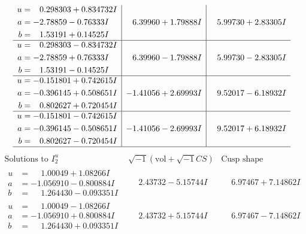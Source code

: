 \documentclass[1p]{elsarticle_modified}
\theoremstyle{definition}
\newcommand{\I}{\sqrt{-1}}
\begin{document}
$$\begin{array}{c|c|c}
\begin{aligned}
u &= \phantom{-}0.298303 + 0.834732 I \\
a &= -2.78859 - 0.76333 I \\
b &= \phantom{-}1.53191 + 0.14525 I\end{aligned}
 & \phantom{-}6.39960 + 1.79888 I & \phantom{-}5.99730 + 2.83305 I \\ \hline\begin{aligned}
u &= \phantom{-}0.298303 - 0.834732 I \\
a &= -2.78859 + 0.76333 I \\
b &= \phantom{-}1.53191 - 0.14525 I\end{aligned}
 & \phantom{-}6.39960 - 1.79888 I & \phantom{-}5.99730 - 2.83305 I \\ \hline\begin{aligned}
u &= -0.151801 + 0.742615 I \\
a &= -0.396145 + 0.508651 I \\
b &= \phantom{-}0.802627 + 0.720454 I\end{aligned}
 & -1.41056 + 2.69993 I & \phantom{-}9.52017 - 6.18932 I \\ \hline\begin{aligned}
u &= -0.151801 - 0.742615 I \\
a &= -0.396145 - 0.508651 I \\
b &= \phantom{-}0.802627 - 0.720454 I\end{aligned}
 & -1.41056 - 2.69993 I & \phantom{-}9.52017 + 6.18932 I\\
 \hline 
 \end{array}$$\newpage$$\begin{array}{c|c|c}  
\text{Solutions to }I^u_{2}& \I (\text{vol} + \sqrt{-1}CS) & \text{Cusp shape}\\
 \hline 
\begin{aligned}
u &= \phantom{-}1.00049 + 1.08266 I \\
a &= -1.056910 - 0.800884 I \\
b &= \phantom{-}1.264430 - 0.093351 I\end{aligned}
 & \phantom{-}2.43732 - 5.15744 I & \phantom{-}6.97467 + 7.14862 I \\ \hline\begin{aligned}
u &= \phantom{-}1.00049 - 1.08266 I \\
a &= -1.056910 + 0.800884 I \\
b &= \phantom{-}1.264430 + 0.093351 I\end{aligned}
 & \phantom{-}2.43732 + 5.15744 I & \phantom{-}6.97467 - 7.14862 I \\ \hline\begin{aligned}

\end{aligned}
\end{array}$$
\end{document}
